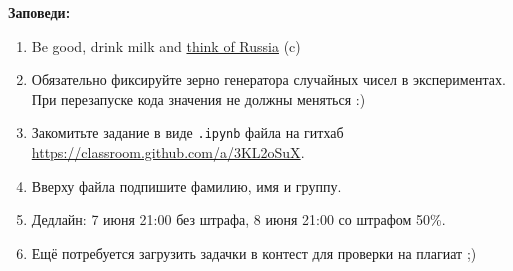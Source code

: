 \documentclass[12pt]{article}
\begin{document}
\vspace{20mm}

\textbf{Заповеди:}

\vspace{5mm}

\begin{enumerate}  
\item Be good, drink milk and \href{https://www.youtube.com/watch?v=jyxSFfBKMxQ}{think of Russia} (c)
\item Обязательно фиксируйте зерно генератора случайных чисел в экспериментах. 
При перезапуске кода значения не должны меняться :)
\item Закомитьте задание в виде \verb|.ipynb| файла на гитхаб \url{https://classroom.github.com/a/3KL2oSuX}.
\item Вверху файла подпишите фамилию, имя и группу.
\item Дедлайн: 7 июня 21:00 без штрафа, 8 июня 21:00 со штрафом 50\%.
\item Ещё потребуется загрузить задачки в контест для проверки на плагиат ;)
\end{enumerate}
\end{document}
